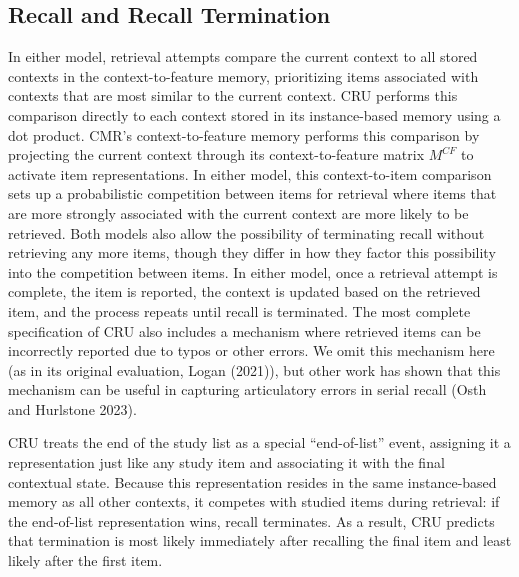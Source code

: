 \documentclass[
  letterpaper,
  11pt,
  english,
  singlespacing,
  headsepline]{MastersDoctoralThesis}
\begin{document}
\subsection{Recall and Recall
Termination}\label{recall-and-recall-termination}

In either model, retrieval attempts compare the current context to all
stored contexts in the context-to-feature memory, prioritizing items
associated with contexts that are most similar to the current context.
CRU performs this comparison directly to each context stored in its
instance-based memory using a dot product. CMR's context-to-feature
memory performs this comparison by projecting the current context
through its context-to-feature matrix \(M^{CF}\) to activate item
representations. In either model, this context-to-item comparison sets
up a probabilistic competition between items for retrieval where items
that are more strongly associated with the current context are more
likely to be retrieved. Both models also allow the possibility of
terminating recall without retrieving any more items, though they differ
in how they factor this possibility into the competition between items.
In either model, once a retrieval attempt is complete, the item is
reported, the context is updated based on the retrieved item, and the
process repeats until recall is terminated. The most complete
specification of CRU also includes a mechanism where retrieved items can
be incorrectly reported due to typos or other errors. We omit this
mechanism here (as in its original evaluation, Logan (2021)), but other
work has shown that this mechanism can be useful in capturing
articulatory errors in serial recall (Osth and Hurlstone 2023).

CRU treats the end of the study list as a special ``end-of-list'' event,
assigning it a representation just like any study item and associating
it with the final contextual state. Because this representation resides
in the same instance-based memory as all other contexts, it competes
with studied items during retrieval: if the end-of-list representation
wins, recall terminates. As a result, CRU predicts that termination is
most likely immediately after recalling the final item and least likely
after the first item.
\end{document}
